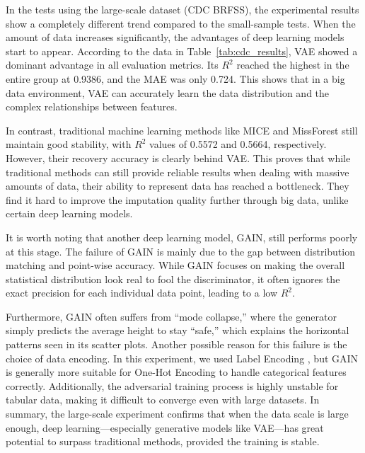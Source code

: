\documentclass[twocolumn, 9pt]{extarticle}
\begin{document}
In the tests using the large-scale dataset (CDC BRFSS), the experimental results show a completely different trend compared to the small-sample tests. When the amount of data increases significantly, the advantages of deep learning models start to appear. According to the data in Table~\ref{tab:cdc_results}, VAE showed a dominant advantage in all evaluation metrics. Its $R^2$ reached the highest in the entire group at 0.9386, and the MAE was only 0.724. This shows that in a big data environment, VAE can accurately learn the data distribution and the complex relationships between features.

In contrast, traditional machine learning methods like MICE and MissForest still maintain good stability, with $R^2$ values of 0.5572 and 0.5664, respectively. However, their recovery accuracy is clearly behind VAE. This proves that while traditional methods can still provide reliable results when dealing with massive amounts of data, their ability to represent data has reached a bottleneck. They find it hard to improve the imputation quality further through big data, unlike certain deep learning models.

It is worth noting that another deep learning model, GAIN, still performs poorly at this stage. The failure of GAIN is mainly due to the gap between distribution matching and point-wise accuracy. While GAIN focuses on making the overall statistical distribution look real to fool the discriminator, it often ignores the exact precision for each individual data point, leading to a low $R^2$. 

Furthermore, GAIN often suffers from ``mode collapse,'' where the generator simply predicts the average height to stay ``safe,'' which explains the horizontal patterns seen in its scatter plots. Another possible reason for this failure is the choice of data encoding. In this experiment, we used Label Encoding , but GAIN is generally more suitable for One-Hot Encoding to handle categorical features correctly. Additionally, the adversarial training process is highly unstable for tabular data, making it difficult to converge even with large datasets. In summary, the large-scale experiment confirms that when the data scale is large enough, deep learning—especially generative models like VAE—has great potential to surpass traditional methods, provided the training is stable.
\end{document}
